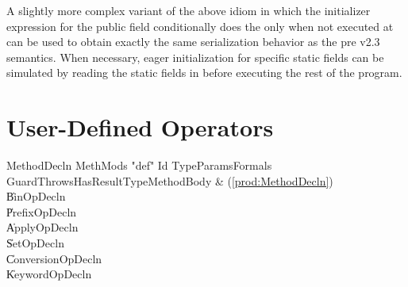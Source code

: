 A slightly more complex variant of the above idiom in which the
initializer expression for the public field conditionally does the 
only when not executed at  can be used to
obtain exactly the same serialization behavior as the pre \Xten{} v2.3
semantics.  When necessary, eager initialization for specific static fields
can be simulated by reading the static fields in  before
executing the rest of the program.

\section{User-Defined Operators}
\label{sect:operators}

\begin{bbgrammar}
         MethodDecln \: MethMods \xcd"def" Id TypeParams\opt Formals Guard\opt Throws\opt HasResultType\opt MethodBody & (\ref{prod:MethodDecln}) \\
                     \| BinOpDecln \\
                     \| PrefixOpDecln \\
                     \| ApplyOpDecln \\
                     \| SetOpDecln \\
                     \| ConversionOpDecln \\
                     \| KeywordOpDecln \\
\end{bbgrammar}


